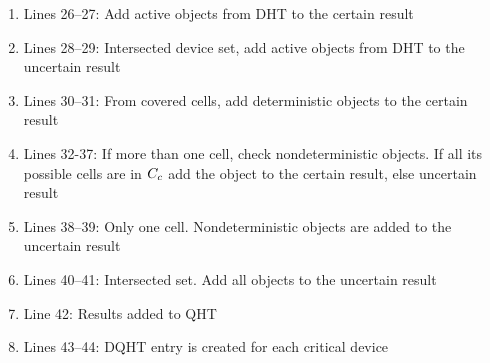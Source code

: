 \begin{frame}
\begin{columns}[c]
\vspace{-10pt}
\scriptsize{
  \begin{enumerate}
    \item Lines 26--27: \textrm{Add active objects from DHT to the certain result} \pause
    \item Lines 28--29: \textrm{Intersected device set, add active objects from DHT to the uncertain result} \pause
    \item Lines 30--31: \textrm{From covered cells, add deterministic objects to the certain result} \pause
    \item Lines 32-37: \textrm{If more than one cell, check nondeterministic objects. If all its possible cells are in $\mathnormal{C_c}$ add the object to the certain result, else uncertain result} \pause
    \item Lines 38--39: \textrm{Only one cell. Nondeterministic objects are added to the uncertain result} \pause
    \item Lines 40--41: \textrm{Intersected set. Add all objects to the uncertain result} \pause
    \item Line 42: \textrm{Results added to QHT} \pause
    \item Lines 43--44: \textrm{DQHT entry is created for each critical device}
  \end{enumerate}
}
\end{columns}

\end{frame}

